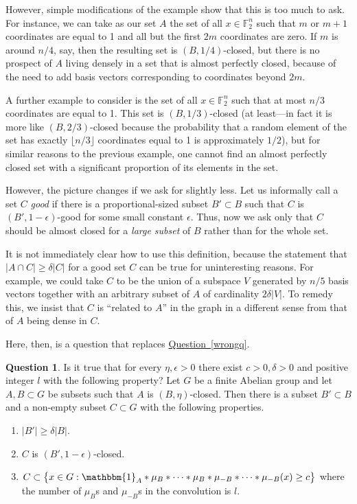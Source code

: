 \documentclass[11pt]{article}
\numberwithin{equation}{section}
\theoremstyle{definition}
\newtheorem{question}[theorem]{Question}
\theoremstyle{plain}
\newcommand{\expref}[2]{\hyperref[#2]{#1~\ref{#2}}}
\newcommand\eps{\epsilon}  %
\newcommand\F{\mathbb{F}}
\renewcommand\d{\delta}
\newcommand{\ind}{\mathbbm{1}}
\renewcommand\AA{\ind_A}
\begin{document}
However, simple modifications of the example show that this is too much to ask. For instance, we can take as our set $A$ the set of all $x\in\F_2^n$ such that $m$ or $m+1$ coordinates are equal to 1 and all but the first $2m$ coordinates are zero. If $m$ is around $n/4$, say, then the resulting set is  $(B,1/4)$-closed, but there is no prospect of $A$ living densely in a set that is almost perfectly closed, because of the need to add basis vectors corresponding to coordinates beyond $2m$. 

A further example to consider is the set of all $x\in\F_2^n$ such that at most $n/3$ coordinates are equal to 1. This set is  $(B,1/3)$-closed (at least---in fact it is more like $(B,2/3)$-closed because the probability that a random element of the set has exactly $\lfloor n/3\rfloor$ coordinates equal to 1 is approximately $1/2$), but for similar reasons to the previous example, one cannot find an almost perfectly closed set with a significant proportion of its elements in the set.

However, the picture changes if we ask for slightly less. Let us informally call a set $C$ \emph{good} if there is a proportional-sized subset $B'\subset B$ such that $C$ is $(B',1-\eps)$-good for some small constant $\eps$. Thus, now we ask only that $C$ should be almost closed for a \emph{large subset} of $B$ rather than for the whole set. 

It is not immediately clear how to use this definition, because the statement that $|A\cap C|\geq\d|C|$ for a good set $C$ can be true for uninteresting reasons. For example, we could take $C$ to be the union of a subspace $V$ generated by $n/5$ basis vectors together with an arbitrary subset of $A$ of cardinality $2\d|V|$. To remedy this, we insist that $C$ is ``related to $A$'' in the graph in a different sense from that of $A$ being dense in $C$.

Here, then, is a question that replaces \expref{Question}{wrongq}.

\begin{question} \label{mainq}
	Is it true that for every $\eta,\eps>0$ there exist $c>0,\d>0$ and positive integer $l$ with the following property? Let $G$ be a finite Abelian group and let $A,B\subset G$ be subsets such that $A$ is $(B,\eta)$-closed. Then there is a subset $B'\subset B$ and a non-empty subset $C\subset G$ with the following properties.
	\begin{enumerate}
		\item $|B'|\geq\d|B|$.
		\item $C$ is  $(B',1-\eps)$-closed.
		\item $C\subset \bigl\{x\in G: \AA*\mu_B*\dots*\mu_B*\mu_{-B}*\dots*\mu_{-B}(x)\geq c\bigr\}$ where the number of $\mu_B$s and $\mu_{-B}$s in the convolution is $l$.
	\end{enumerate}
\end{question}
\end{document}
